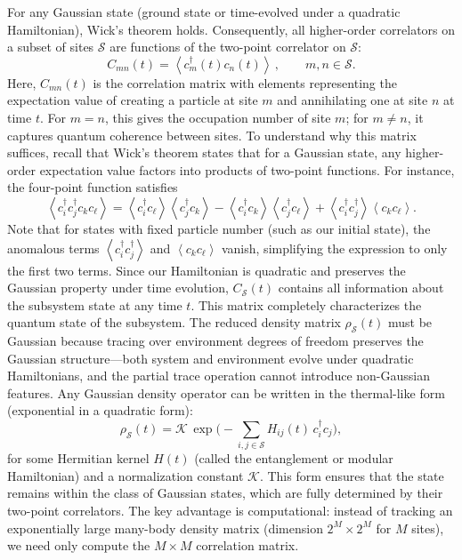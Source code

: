 \documentclass[12pt,oneside,openright]{report}
\theoremstyle{definition}
\theoremstyle{plain}
\theoremstyle{remark}
\newcommand{\avg}[1]{\left\langle#1\right\rangle}
\newcommand{\beq}{\begin{equation}}
\newcommand{\eeq}{\end{equation}}
\begin{document}
For any Gaussian state (ground state or time-evolved under a quadratic Hamiltonian), Wick’s theorem holds. Consequently, all higher-order 
correlators on a subset of sites \(\mathcal{S}\) are functions of the two-point correlator on \(\mathcal{S}\):
\beq
 C_{mn}(t)=\avg{c_m^\dagger(t) c_n(t)}\,, \qquad m,n\in\mathcal{S}.
 \label{eq:subC_def}
\eeq
Here, $C_{mn}(t)$ is the correlation matrix with elements representing the expectation value of creating a particle at site $m$ and 
annihilating one at site $n$ at time $t$. For $m=n$, this gives the occupation number of site $m$; for $m \neq n$, it captures quantum coherence between sites. 
To understand why this matrix suffices, recall that Wick's theorem states that for a Gaussian state, any higher-order expectation value factors 
into products of two-point functions. For instance, the four-point function satisfies
\beq
\avg{c_i^\dagger c_j^\dagger c_k c_\ell} = \avg{c_i^\dagger c_\ell}\avg{c_j^\dagger c_k} 
- \avg{c_i^\dagger c_k}\avg{c_j^\dagger c_\ell} + \avg{c_i^\dagger c_j^\dagger}\avg{c_k c_\ell}.
\label{eq:wick_example}
\eeq
Note that for states with fixed particle number (such as our initial state), the anomalous terms $\avg{c_i^\dagger c_j^\dagger}$ and $\avg{c_k c_\ell}$ vanish, simplifying the expression to only the first two terms.
Since our Hamiltonian is quadratic and preserves the Gaussian property under time evolution, $C_{\mathcal{S}}(t)$ contains all information 
about the subsystem state at any time $t$. This matrix completely characterizes the quantum state of the subsystem.
The reduced density matrix \(\rho_{\mathcal{S}}(t)\) must be Gaussian because tracing over environment degrees of freedom preserves the Gaussian structure---both system and environment evolve under quadratic Hamiltonians, and the partial trace operation cannot introduce non-Gaussian features. Any Gaussian density operator can be written in the thermal-like form (exponential in a quadratic form):
\beq
 \rho_{\mathcal{S}}(t)=\mathcal{K}\,\exp\!\Big(-\sum_{i,j\in\mathcal{S}} H_{ij}(t)\, c_i^\dagger c_j\Big),
 \label{eq:rho_gaussian}
\eeq
for some Hermitian kernel \(H(t)\) (called the entanglement or modular Hamiltonian) and a normalization constant \(\mathcal{K}\). 
This form ensures that the state remains within the class of Gaussian states, which are fully determined by their two-point correlators. The key advantage is computational: instead of tracking an exponentially large many-body density matrix (dimension $2^M \times 2^M$ for $M$ sites), we need only compute the $M \times M$ correlation matrix.
\end{document}
